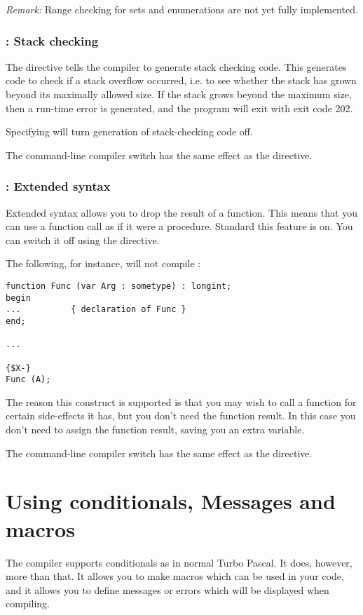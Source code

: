 \documentclass{report}
\begin{document}
{\em Remark: } Range checking for sets and enumerations are not yet fully
implemented.

\subsection{ : Stack checking}
The  directive tells the compiler to generate stack checking
code. This generates code to check if a stack overflow occurred, i.e. to see
whether the stack has grown beyond its maximally allowed size. If the stack
grows beyond the maximum size, then a run-time error is generated, and the
program will exit with exit code 202.

Specifying  will turn generation of stack-checking code off.

The command-line compiler switch  has the same effect as the
 directive.


\subsection{ : Extended syntax}
Extended syntax allows you to drop the result of a function. This means that
you can use a function call as if it were a procedure. Standard this feature
is on. You can switch it off using the  directive.

The following, for instance, will not compile :
\begin{verbatim}
function Func (var Arg : sometype) : longint;
begin
...          { declaration of Func }
end;

...

{$X-}
Func (A);
\end{verbatim}
The reason this construct is supported is that you may wish to call a
function for certain side-effects it has, but you don't need the function
result. In this case you don't need to assign the function result, saving
you an extra variable.

The command-line compiler switch  has the same effect as the
 directive.


\chapter{Using conditionals, Messages and macros}
\label{ch:CondMessageMacro}
The \fpc compiler supports conditionals as in normal Turbo Pascal. It does,
however, more than that. It allows you to make macros which can be used in
your code, and it allows you to define messages or errors which will be
displayed when compiling.
\end{document}
